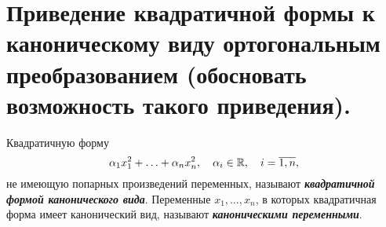 \section{
    Приведение квадратичной формы к каноническому виду ортогональным преобразованием (обосновать возможность такого приведения).
}
    
\begin{definition}
    Квадратичную форму
    $$\alpha_1x_1^2 + \ldots + \alpha_nx_n^2, \quad \alpha_i \in \mathbb{R}, \quad i = \overline{1, n},$$
    не имеющую попарных произведений переменных, называют \textit{\textbf{квадратичной формой канонического вида}}. Переменные $x_1, \ldots, x_n$, в которых квадратичная форма имеет канонический вид, называют \textbf{\textit{каноническими переменными}}.
\end{definition}